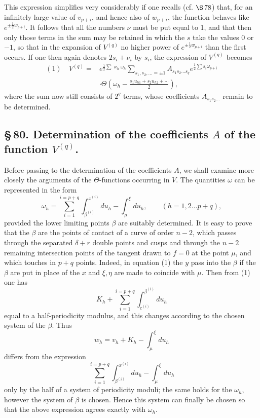 \documentclass[10pt]{article}
\begin{document}
This expression simplifies very considerably if one recalls (cf. \(\S\,78\)) that, for an infinitely large value of \(v_{p+i}\), and hence also of \(w_{p+i}\), the function behaves like \(e^{\pm\frac12w_{p+i}}\). It follows that all the numbers \(\nu\) must be put equal to 1, and that then only those terms in the sum may be retained in which the \(s\) take the values 0 or \(-1\), so that in the expansion of \(V^{(q)}\) no higher power of \(e^{\pm\frac12w_{p+i}}\) than the first occurs. If one then again denotes \(2s_i+\nu_i\) by \(s_i\), the expression of \(V^{(q)}\) becomes
\[
\begin{aligned}
(1)\quad V^{(q)}={}&e^{\frac12\sum\varkappa_h\omega_h}
\sum_{s_1,s_2,\ldots=\pm1} A_{s_1s_2\ldots s_q}
 e^{\frac12\sum s_i\omega_{p+i}}\\
&\cdot\Theta\left(\omega_h-\frac{s_1u_{h1}+s_2u_{h2}+\cdots}{2}\right),
\end{aligned}
\]
where the sum now still consists of \(2^q\) terms, whose coefficients \(A_{s_1s_2\ldots}\) remain to be determined.

\subsection*{\S\,80. Determination of the coefficients \(A\) of the function \(V^{(q)}\).}

Before passing to the determination of the coefficients \(A\), we shall examine more closely the arguments of the \(\Theta\)-functions occurring in \(V\). The quantities \(\omega\) can be represented in the form
\[
\omega_h=\sum_{i=1}^{i=p+q}\int_{\beta^{(i)}}^{x^{(i)}}du_h-\int_{\mu}^{\xi}du_h,
\qquad (h=1,2\ldots p+q),
\]
provided the lower limiting points \(\beta\) are suitably determined. It is easy to prove that the \(\beta\) are the points of contact of a curve of order \(n-2\), which passes through the separated \(\delta+r\) double points and cusps and through the \(n-2\) remaining intersection points of the tangent drawn to \(f=0\) at the point \(\mu\), and which touches in \(p+q\) points. Indeed, in equation (1) the \(y\) pass into the \(\beta\) if the \(\beta\) are put in place of the \(x\) and \(\xi,\eta\) are made to coincide with \(\mu\). Then from (1) one has
\[
K_h+\sum_{i=1}^{i=p+q}\int_{c^{(i)}}^{\beta^{(i)}}du_h
\]
equal to a half-periodicity modulus, and this changes according to the chosen system of the \(\beta\). Thus
\[
w_h=v_h+K_h-\int_{\mu}^{\xi}du_h
\]
differs from the expression
\[
\sum_{i=1}^{i=p+q}\int_{\beta^{(i)}}^{x^{(i)}}du_h-\int_{\mu}^{\xi}du_h
\]
only by the half of a system of periodicity moduli; the same holds for the \(\omega_h\), however the system of \(\beta\) is chosen. Hence this system can finally be chosen so that the above expression agrees exactly with \(\omega_h\).
\end{document}
